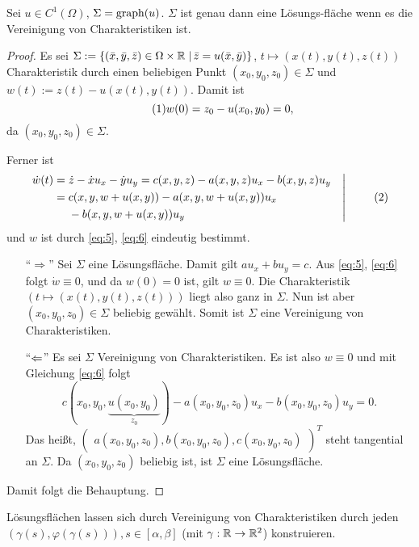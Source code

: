 \begin{lemma}
  Sei $u\in C^1(\Omega)$, $\Sigma=\operatorname{graph}(u)$. $\Sigma$ ist genau dann eine Lösungs-fläche wenn es die Vereinigung von Charakteristiken ist.
\end{lemma}

\begin{proof}
  Es sei $\Sigma:=\{(\bar x, \bar y, \bar z)\in\Omega\times\mathbb{R}\;\vert\, \bar z=u(\bar x,\bar y)\}$, $t\mapsto(x(t),y(t),z(t))$ Charakteristik durch einen beliebigen Punkt $(x_0,y_0,z_0)\in\Sigma$ und $w(t):=z(t)-u(x(t),y(t))$. Damit ist
  \[
  \eq{eq:5}
  w(0)=z_0-u(x_0,y_0)=0,  
  \]
  da $(x_0,y_0,z_0)\in\Sigma$.

  Ferner ist 
  \[
  \left.
    \begin{aligned}
      \dot w(t)=\;&\dot z-\dot xu_x-\dot yu_y=c(x,y,z)-a(x,y,z)u_x-b(x,y,z)u_y \\
      =\;& c(x,y,w+u(x,y))-a(x,y,w+u(x,y))u_x \\
      &-b(x,y,w+u(x,y))u_y
    \end{aligned}
    \quad
  \right\vert
  \eq{eq:6}
  \]
  und $w$ ist durch \eqref{eq:5}, \eqref{eq:6} eindeutig bestimmt.
  
  \begin{itemize}
  \item["`$\Rightarrow$"']  Sei $\Sigma$ eine Lösungsfläche. Damit gilt $au_x+bu_y=c$. Aus \eqref{eq:5}, \eqref{eq:6} folgt $\dot w\equiv 0$, und da $w(0)=0$ ist, gilt $w\equiv 0$. Die Charakteristik $(t\mapsto (x(t),y(t),z(t)))$ liegt also ganz in $\Sigma$. Nun ist aber $(x_0,y_0,z_0)\in\Sigma$ beliebig gewählt. Somit ist $\Sigma$ eine Vereinigung von Charakteristiken.

  \item["`$\Leftarrow$"'] Es sei $\Sigma$ Vereinigung von Charakteristiken. Es ist also $w\equiv 0$ und mit Gleichung \eqref{eq:6} folgt 
    \[
    c(x_0,y_0,\underbrace{u(x_0,y_0)}_{z_0})-a(x_0,y_0,z_0)u_x
    -b(x_0,y_0,z_0)u_y=0.
    \]
    Das heißt, $
      \begin{pmatrix}
        a(x_0,y_0,z_0) ,
        b(x_0,y_0,z_0) ,
        c(x_0,y_0,z_0)
      \end{pmatrix}^T
      $ steht tangential an $\Sigma$. Da $(x_0,y_0,z_0)$ beliebig ist, ist $\Sigma$ eine Lösungsfläche.
  \end{itemize}
  Damit folgt die Behauptung.
\end{proof}

\begin{folge}
  Lösungsflächen lassen sich durch Vereinigung von Charakteristiken durch jeden $(\gamma(s),\varphi(\gamma(s))), s\in [\alpha,\beta]$ (mit $\gamma : \mathbb{R} \rightarrow \mathbb{R}^2$) konstruieren.
\end{folge}

